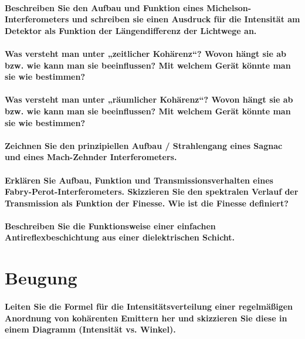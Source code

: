 \documentclass[a4paper, 11pt, parskip=half]{scrartcl}
\begin{document}
\paragraph{Beschreiben Sie den Aufbau und Funktion eines Michelson-Interferometers und schreiben
sie einen Ausdruck für die Intensität am Detektor als Funktion der Längendifferenz der
Lichtwege an.}

\paragraph{Was versteht man unter „zeitlicher Kohärenz“? Wovon hängt sie ab bzw. wie kann man sie
beeinflussen? Mit welchem Gerät könnte man sie wie bestimmen?}

\paragraph{Was versteht man unter „räumlicher Kohärenz“? Wovon hängt sie ab bzw. wie kann man sie
beeinflussen? Mit welchem Gerät könnte man sie wie bestimmen?}

\paragraph{Zeichnen Sie den prinzipiellen Aufbau / Strahlengang eines Sagnac und eines Mach-Zehnder Interferometers.}

\paragraph{Erklären Sie Aufbau, Funktion und Transmissionsverhalten eines
Fabry-Perot-Interferometers. Skizzieren Sie den spektralen Verlauf der Transmission als Funktion der
Finesse. Wie ist die Finesse definiert?}

\paragraph{Beschreiben Sie die Funktionsweise einer einfachen Antireflexbeschichtung aus einer
dielektrischen Schicht.}

\newpage

\section{Beugung}

\paragraph{Leiten Sie die Formel für die Intensitätsverteilung einer regelmäßigen Anordnung von
kohärenten Emittern her und skizzieren Sie diese in einem Diagramm (Intensität vs.
Winkel).}
\end{document}
